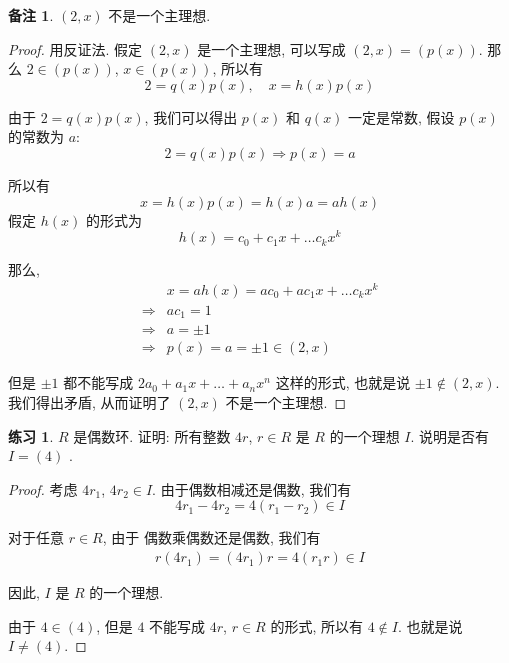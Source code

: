 \documentclass[utf8]{ctexbook}
\theoremstyle{definition}
\newtheorem{memo}{备注}[section]
\newtheorem{exercise}{练习}[section]
\begin{document}
\begin{memo}\label{memo_2_x_not_max_ideal}
$(2, x)$ 不是一个主理想. 
\end{memo}

\begin{proof}
用反证法. 假定 $(2, x)$ 是一个主理想, 可以写成 $(2, x) = (p(x))$. 那么 $2 \in (p(x))$, $x \in (p(x))$, 所以有
\begin{equation}
2 = q(x) p(x), \quad x = h(x) p(x) \nonumber
\end{equation} 

由于 $2 = q(x) p(x)$, 我们可以得出 $p(x)$ 和 $q(x)$ 一定是常数, 假设 $p(x)$ 的常数为 $a$:
\begin{equation}
2 = q(x) p(x) \Longrightarrow p(x) = a   \nonumber
\end{equation} 

所以有
\begin{equation}
x = h(x) p(x) = h(x) a = a h(x) \nonumber
\end{equation}
假定 $h(x)$ 的形式为
\begin{equation}
h(x) = c_0 + c_1 x + \ldots c_k x^k \nonumber
\end{equation}

那么,
\begin{align*}
& x = a h(x) = a c_0 + a c_1 x + \ldots c_k x^k  \\
\Longrightarrow & a c_1 = 1 \\
\Longrightarrow & a = \pm 1 \\
\Longrightarrow & p(x) = a = \pm 1 \in (2, x)
\end{align*}

但是 $\pm 1$ 都不能写成 $2 a_0 + a_1 x + \ldots + a_n x^n$ 这样的形式, 也就是说 $\pm 1 \not \in (2, x)$. 我们得出矛盾, 从而证明了 $(2, x)$ 不是一个主理想.
\end{proof}

\begin{exercise}
$R$ 是偶数环. 证明: 所有整数 $4r$, $r \in R$ 是 $R$ 的一个理想 $I$. 说明是否有 $I = (4)$ .
\end{exercise}

\begin{proof}
考虑 $4 r_1$, $4 r_2 \in I$. 由于偶数相减还是偶数, 我们有
\begin{equation}
4 r_1 - 4 r_2 = 4(r_1 - r_2) \in I \nonumber
\end{equation}

对于任意 $r \in R$, 由于 偶数乘偶数还是偶数, 我们有
\begin{align*}
r( 4 r_1) = (4 r_1) r = 4 (r_1 r) \in I
\end{align*}

因此, $I$ 是 $R$ 的一个理想.

由于 $4 \in (4)$, 但是 $4$ 不能写成 $4r$, $r \in R$ 的形式, 所以有 $4 \not \in I$. 也就是说 $I \neq (4)$.

\end{proof}
\end{document}
